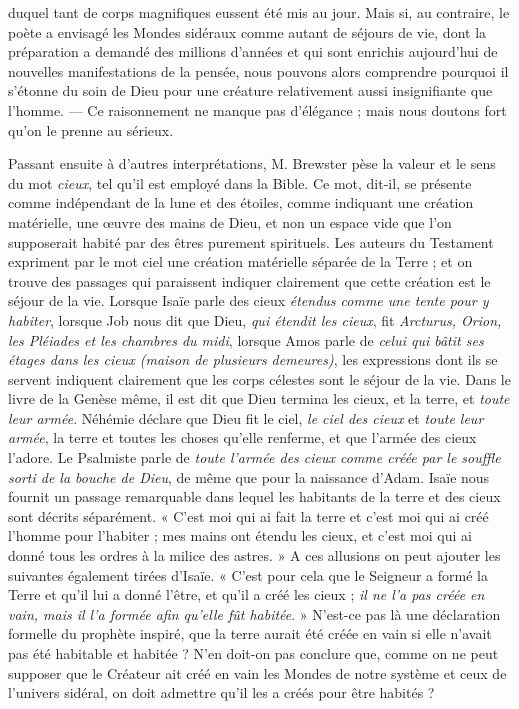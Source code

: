 \documentclass[a4paper, 11pt, oneside]{article}
\begin{document}
duquel tant de corps magnifiques eussent été mis au jour. Mais si, au contraire, le poète a envisagé les Mondes sidéraux comme autant de séjours de vie, dont la préparation a demandé des millions d'années et qui sont enrichis aujourd'hui de nouvelles manifestations de la pensée, nous pouvons alors comprendre pourquoi il s'étonne du soin de Dieu pour une créature relativement aussi insignifiante que l'homme. --- Ce raisonnement ne manque pas d'élégance ; mais nous doutons fort qu'on le prenne au sérieux.

Passant ensuite à d'autres interprétations, M. Brewster pèse la valeur et le sens du mot \emph{cieux}, tel qu'il est employé dans la Bible. Ce mot, dit-il, se présente comme indépendant de la lune et des étoiles, comme indiquant une création matérielle, une œuvre des mains de Dieu, et non un espace vide que l'on supposerait habité par des êtres purement spirituels. Les auteurs du Testament expriment par le mot ciel une création matérielle séparée de la Terre ; et on trouve des passages qui paraissent indiquer clairement que cette création est le séjour de la vie. Lorsque Isaïe parle des cieux \emph{étendus comme une tente pour y habiter}, lorsque Job nous dit que Dieu, \emph{qui étendit les cieux}, fit \emph{Arcturus, Orion, les Pléiades et les chambres du midi}, lorsque Amos parle de \emph{celui qui bâtit ses étages dans les cieux (maison de plusieurs demeures)}, les expressions dont ils se servent indiquent clairement que les corps célestes sont le séjour de la vie. Dans le livre de la Genèse même, il est dit que Dieu termina les cieux, et la terre, et \emph{toute leur armée}. Néhémie déclare que Dieu fit le ciel, \emph{le ciel des cieux} et \emph{toute leur armée}, la terre et toutes les choses qu'elle renferme, et que l'armée des cieux l'adore. Le Psalmiste parle de \emph{toute l'armée des cieux comme créée par le souffle sorti de la bouche de Dieu}, de même que pour la naissance d'Adam. Isaïe nous fournit un passage remarquable dans lequel les habitants de la terre et des cieux sont décrits séparément. « C'est moi qui ai fait la terre et c'est moi qui ai créé l'homme pour l'habiter ; mes mains ont étendu les cieux, et c'est moi qui ai donné tous les ordres à la milice des astres. » A ces allusions on peut ajouter les suivantes également tirées d'Isaïe. « C'est pour cela que le Seigneur a formé la Terre et qu'il lui a donné l'être, et qu'il a créé les cieux ; \emph{il ne l'a pas créée en vain, mais il l'a formée afin qu'elle fût habitée}. » N'est-ce pas là une déclaration formelle du prophète inspiré, que la terre aurait été créée en vain si elle n'avait pas été habitable et habitée ? N'en doit-on pas conclure que, comme on ne peut supposer que le Créateur ait créé en vain les Mondes de notre système et ceux de l'univers sidéral, on doit admettre qu'il les a créés pour être habités ?
\end{document}
